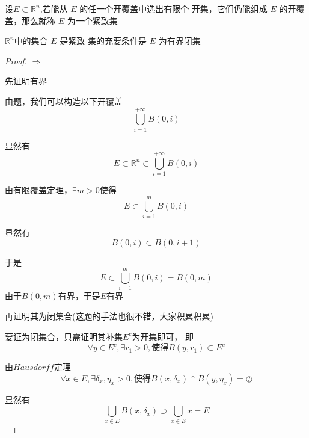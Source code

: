 \documentclass[lang=cn,10pt]{elegantbook}
\begin{document}
\begin{definition}
	$\text{设}E\subset \mathbb{R} ^n$,若能从 $E$ 的任一个开覆盖中选出有限个
	开集，它们仍能组成 $E$ 的开覆盖，那么就称 $E$ 为一个紧致集
\end{definition}
\begin{theorem}
	$ \mathbb{R} ^n$中的集合 $E$ 是紧致
	集的充要条件是 $E$ 为有界闭集
\end{theorem}
\begin{proof}
	
	$\Rightarrow$
	
	先证明有界
	
	由题，我们可以构造以下开覆盖
	\begin{equation*}
		\bigcup_{i=1}^{+\infty}{B\left( 0,i \right)}
	\end{equation*}
	
	显然有
	\begin{equation*}
		E\subset\mathbb{R} ^n \subset	\bigcup_{i=1}^{+\infty}{B\left( 0,i \right)}
	\end{equation*}
	
	由有限覆盖定理，$\exists m>0$使得
	\begin{equation*}
		E\subset	\bigcup_{i=1}^{m}{B\left( 0,i \right)}
	\end{equation*}
	
	显然有
	\begin{equation*}
		B(0,i)\subset B(0,i+1)
	\end{equation*}
	
	于是
	\begin{equation*}
		E\subset	\bigcup_{i=1}^{m}{B\left( 0,i \right)}=B(0,m)
	\end{equation*}
	由于$ B(0,m)$有界，于是$E$有界
	
	再证明其为闭集合(这题的手法也很不错，大家积累积累)
	
	要证为闭集合，只需证明其补集$E^{c}$为开集即可，
	即
	\begin{equation*}
		\forall y\in E^c,\exists r_1>0,\text{使得}B\left( y,r_1 \right) \subset E^c
	\end{equation*}
	
	由$Hausdorff$定理
	\begin{equation*}
		\forall x\in E,\exists \delta _x,\eta _x>0,\text{使得}B\left( x,\delta _x \right) \cap B\left( y,\eta _x \right) =\oslash 
	\end{equation*}
	
	显然有
	\begin{equation*}
		\bigcup_{x\in E}{B\left( x,\delta _x \right)}\supset \bigcup_{x\in E}{x}=E
	\end{equation*}
	

\end{proof}
\end{document}
